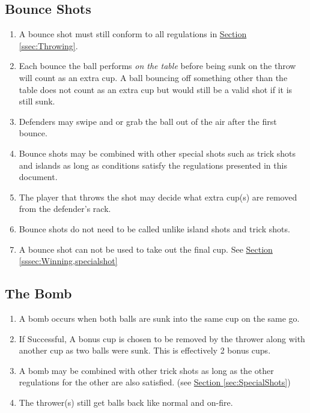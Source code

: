 	\subsection{Bounce Shots}\label{ssec:BounceShots}
		\begin{enumerate}[label=(\roman*)]
            \item \label{sssec:BounceShots,rules} A bounce shot must still conform to all regulations in \hyperref[ssec:Throwing]{Section \ref{ssec:Throwing}}.
            \item \label{sssec:BounceShots,multibounce} Each bounce the ball performs \textit{on the table} before being sunk on the throw will count as an extra cup.
                A ball bouncing off something other than the table does not count as an extra cup but would still be a valid shot if it is still sunk.
            \item \label{sssec:BounceShots,swipegrab} Defenders may swipe and or grab the ball out of the air after the first bounce.
            \item \label{sssec:BounceShots,combo} Bounce shots may be combined with other special shots such as trick shots and islands as long as conditions satisfy the regulations presented in this document.
            \item \label{sssec:BounceShots,removedcups} The player that throws the shot may decide what extra cup(s) are removed from the defender's rack.
            \item \label{sssec:BounceShots,calling} Bounce shots do not need to be called unlike island shots and trick shots.
            \item \label{sssec:BounceShots,winning} A bounce shot can not be used to take out the final cup.
                See \hyperref[sssec:Winning,specialshot]{Section \ref{sssec:Winning,specialshot}}
    \end{enumerate}
	\subsection{The Bomb}\label{ssec:Bomb}
        \begin{enumerate}[label=(\roman*)]
            \item \label{sssec:Bomb,condition} A bomb occurs when both balls are sunk into the same cup on the same go. 
            \item \label{sssec:Bomb,success} If Successful, A bonus cup is chosen to be removed by the thrower along with another cup as two balls were sunk.
                This is effectively 2 bonus cups.
            \item \label{sssec:Bomb,combo} A bomb may be combined with other trick shots as long as the other regulations for the other are also satisfied.
                (see \hyperref[sec:SpecialShots]{Section \ref{sec:SpecialShots}})
            \item \label{sssec:Bomb,ballback} The thrower(s) still get balls back like normal and on-fire.
        \end{enumerate}
